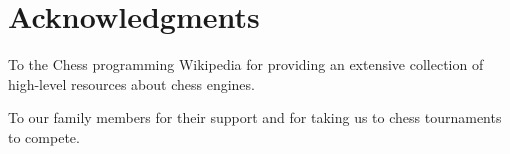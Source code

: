 
\chapter*{Acknowledgments}

To the Chess programming Wikipedia for providing an extensive collection of high-level resources about chess engines.

\vspace{1em}

\noindent  To our family members for their support and for taking us to chess tournaments to compete.
